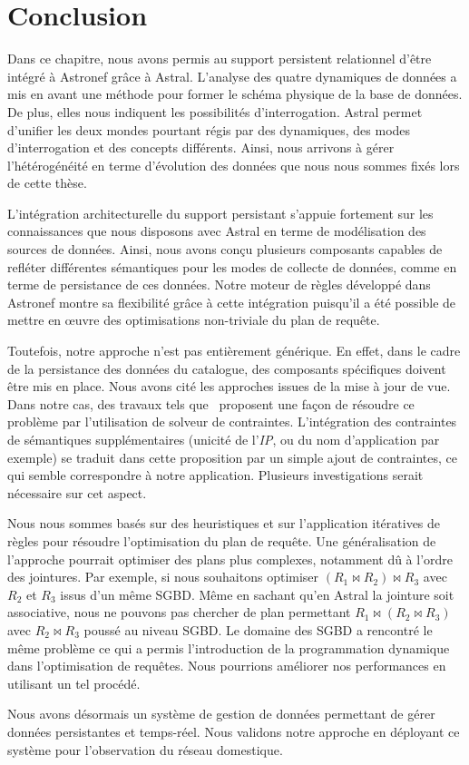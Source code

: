 \section{Conclusion}\label{sec:contrib:asteroid:conclusion}
Dans ce chapitre, nous avons permis au support persistent relationnel d'être intégré à Astronef grâce à Astral. L'analyse des quatre dynamiques de données a mis en avant une méthode pour former le schéma physique de la base de données. De plus, elles nous indiquent les possibilités d'interrogation. Astral permet d'unifier les deux mondes pourtant régis par des dynamiques, des modes d'interrogation et des concepts différents. Ainsi, nous arrivons à gérer l'hétérogénéité en terme d'évolution des données que nous nous sommes fixés lors de cette thèse.

L'intégration architecturelle du support persistant s'appuie fortement sur les connaissances que nous disposons avec Astral en terme de modélisation des sources de données. Ainsi, nous avons conçu plusieurs composants capables de refléter différentes sémantiques pour les modes de collecte de données, comme en terme de persistance de ces données. Notre moteur de règles développé dans Astronef montre sa flexibilité grâce à cette intégration puisqu'il a été possible de mettre en œuvre des optimisations non-triviale du plan de requête.

Toutefois, notre approche n'est pas entièrement générique. En effet, dans le cadre de la persistance des données du catalogue, des composants spécifiques doivent être mis en place. Nous avons cité les approches issues de la mise à jour de vue. Dans notre cas, des travaux tels que~\cite{Shu:viewupdate} proposent une façon de résoudre ce problème par l'utilisation de solveur de contraintes. L'intégration des contraintes de sémantiques supplémentaires (unicité de l'\textit{IP}, ou du nom d'application par exemple) se traduit dans cette proposition par un simple ajout de contraintes, ce qui semble correspondre à notre application. Plusieurs investigations serait nécessaire sur cet aspect.

Nous nous sommes basés sur des heuristiques et sur l'application itératives de règles pour résoudre l'optimisation du plan de requête. Une généralisation de l'approche pourrait optimiser des plans plus complexes, notamment dû à l'ordre des jointures. Par exemple, si nous souhaitons optimiser $(R_1 \Join R_2) \Join R_3$ avec $R_2$ et $R_3$ issus d'un même SGBD. Même en sachant qu'en Astral la jointure soit associative, nous ne pouvons pas chercher de plan permettant $R_1 \Join (R_2 \Join R_3)$ avec $R_2\Join R_3$ poussé au niveau SGBD. Le domaine des SGBD a rencontré le même problème ce qui a permis l'introduction de la programmation dynamique dans l'optimisation de requêtes. Nous pourrions améliorer nos performances en utilisant un tel procédé.

Nous avons désormais un système de gestion de données permettant de gérer données persistantes et temps-réel. Nous validons notre approche en déployant ce système pour l'observation du réseau domestique.
